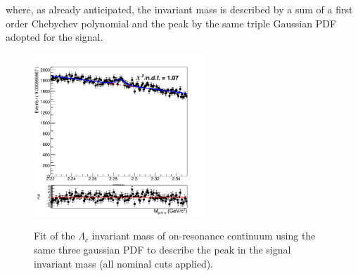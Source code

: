 where, as already anticipated, the invariant mass is described by a sum of a first order Chebychev polynomial and the peak by the same triple Gaussian PDF adopted for the signal.

\begin{figure}[H]
   
    \centering\includegraphics[width=6.4cm]{04-chargedCorrBtoLambda/figs/stream01234Continuum_charged_corrLambdaC_3GaussianInvMfit.png}
    \label{fig:charged_corrLambdaC_InvM_continuumMC_3Gaussianfit}
\caption{Fit of the $\Lambda_c$ invariant mass of on-resonance continuum using the same three gaussian PDF to describe the peak in the signal invariant mass (all nominal cuts applied).}%
\end{figure} 



 
